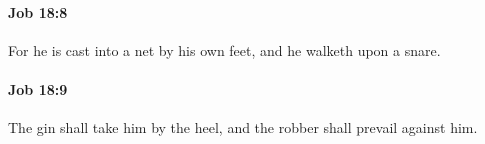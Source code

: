 		\paragraph{Job 18:8} %
			\label{JOB-18-8}

			For he is cast into a net by his own feet, and he walketh upon a snare.


		\paragraph{Job 18:9} %
			\label{JOB-18-9}

			The gin shall take him by the heel, and the robber shall prevail against him.



